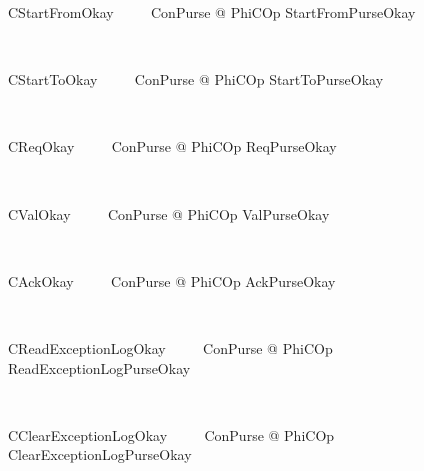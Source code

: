 \begin{LNewSDef}
\begin{zed}
   CStartFromOkay ~~~~ \exists \Delta ConPurse @ PhiCOp \land StartFromPurseOkay
\end{zed}~\end{LNewSDef}

\begin{LNewSDef}
\begin{zed}
   CStartToOkay ~~~~ \exists \Delta ConPurse @ PhiCOp \land StartToPurseOkay
\end{zed}~\end{LNewSDef}

\begin{LNewSDef}
\begin{zed}
   CReqOkay ~~~~ \exists \Delta ConPurse @ PhiCOp \land ReqPurseOkay
\end{zed}~\end{LNewSDef}
%
\begin{LNewSDef}
\begin{zed}
   CValOkay ~~~~ \exists \Delta ConPurse @ PhiCOp \land ValPurseOkay
\end{zed}~\end{LNewSDef}
%
\begin{LNewSDef}
\begin{zed}
   CAckOkay ~~~~ \exists \Delta ConPurse @ PhiCOp \land AckPurseOkay
\end{zed}~\end{LNewSDef}

\begin{LNewSDef}
\begin{zed}
   CReadExceptionLogOkay ~~~~ \exists \Delta ConPurse @ PhiCOp \land ReadExceptionLogPurseOkay
\end{zed}~\end{LNewSDef}

\begin{LNewSDef}
\begin{zed}
   CClearExceptionLogOkay ~~~~ \exists \Delta ConPurse @ PhiCOp \land ClearExceptionLogPurseOkay
\end{zed}~\end{LNewSDef}

